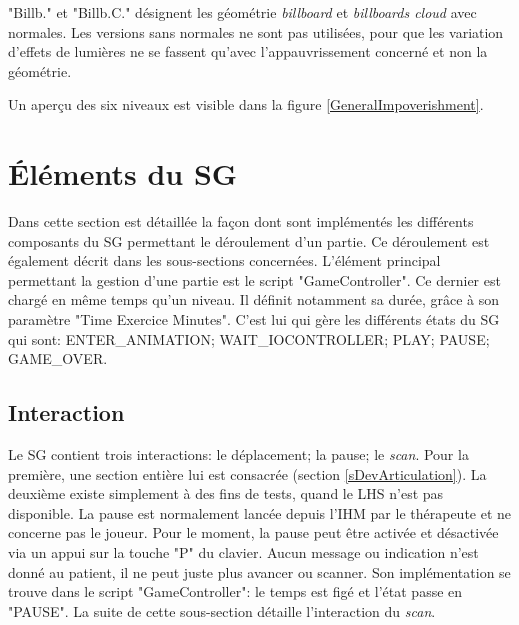 		"Billb." et "Billb.C." désignent les géométrie \textit{billboard} et \textit{billboards cloud} avec normales. Les versions sans normales ne sont pas utilisées, pour que les variation d'effets de lumières ne se fassent qu'avec l'appauvrissement concerné et non la géométrie.
		
		Un aperçu des six niveaux est visible dans la figure \ref{GeneralImpoverishment}.\medskip
		
		\begin{minipage}{\linewidth}
			\label{GeneralImpoverishment}
		\end{minipage}\medskip%

\section{Éléments du SG}
	\label{sDevDeroulementPartie}
	
	Dans cette section est détaillée la façon dont sont implémentés les différents composants du SG permettant le déroulement d'un partie. Ce déroulement est également décrit dans les sous-sections concernées. L'élément principal permettant la gestion d'une partie est le script "GameController". Ce dernier est chargé en même temps qu'un niveau. Il définit notamment sa durée, grâce à son paramètre "Time Exercice Minutes". C'est lui qui gère les différents états du SG qui sont: ENTER\_ANIMATION; WAIT\_IOCONTROLLER; PLAY; PAUSE; GAME\_OVER.
	
	\subsection*{Interaction}
		Le SG contient trois interactions: le déplacement; la pause; le \textit{scan}. Pour la première, une section entière lui est consacrée (section \ref{sDevArticulation}). La deuxième existe simplement à des fins de tests, quand le LHS n'est pas disponible. La pause est normalement lancée depuis l'IHM par le thérapeute et ne concerne pas le joueur. Pour le moment, la pause peut être activée et désactivée via un appui sur la touche "P" du clavier. Aucun message ou indication n'est donné au patient, il ne peut juste plus avancer ou scanner. Son implémentation se trouve dans le script "GameController": le temps est figé et l'état passe en "PAUSE". La suite de cette sous-section détaille l'interaction du \textit{scan}.
		\\
		
